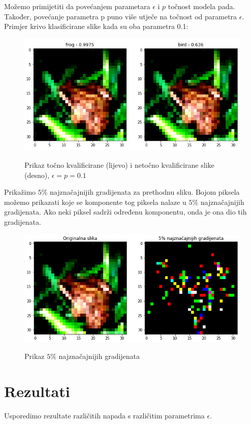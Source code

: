 Možemo primijetiti da povećanjem parametara $\epsilon$ i $p$ točnost modela pada. Također, povećanje parametra p puno više utječe na točnost od parametra $\epsilon$. Primjer krivo klasificirane slike kada su oba parametra 0.1:
\begin{figure}[H]
	\centering
	{{\includegraphics[width=11.5cm]{slike/napadi/selected-grads-example.png} }}%
	\caption{Prikaz točno kvalificirane (lijevo) i netočno kvalificirane slike (desno), $\epsilon = p = 0.1$}%
	\label{fig:pixel_fgsm}%
\end{figure}

Prikažimo $5\%$ najznačajnijih gradijenata za prethodnu sliku. Bojom piksela možemo prikazati koje se komponente tog piksela nalaze u $5\%$ najznačajnijih gradijenata. Ako neki piksel sadrži određenu komponentu, onda je ona dio tih gradijenata.
\begin{figure}[H]
	\centering
	{{\includegraphics[width=11.5cm]{slike/napadi/selected-grads-visualisation.png} }}%
	\caption{Prikaz $5\%$ najznačajnijih gradijenata}%
	\label{fig:najznacajniji}%
\end{figure}

\section{Rezultati}

Usporedimo rezultate različitih napada s različitim parametrima $\epsilon$. \\

